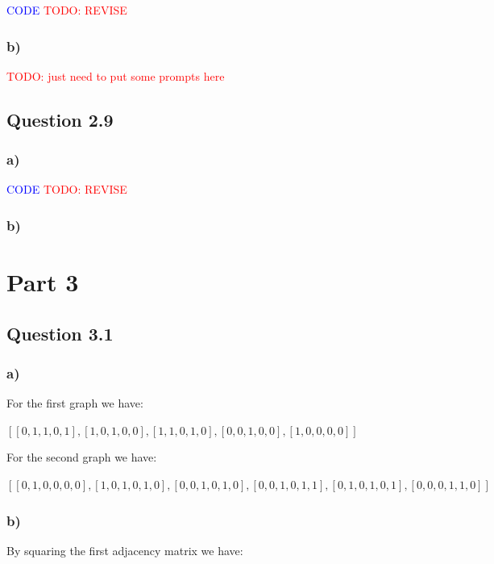 \documentclass{article}
\begin{document}
\textcolor{blue}{CODE}
\textcolor{red}{TODO: REVISE}

\subsubsection*{b)}

\textcolor{red}{TODO: just need to put some prompts here}

\subsection*{Question 2.9}

\subsubsection*{a)}

\textcolor{blue}{CODE}
\textcolor{red}{TODO: REVISE}

\subsubsection*{b)}

\newpage

\section*{Part 3}

\subsection*{Question 3.1}

\subsubsection*{a)}

For the first graph we have:

$[
[0, 1, 1, 0, 1],
[1, 0, 1, 0, 0],
[1, 1, 0, 1, 0],
[0, 0, 1, 0, 0],
[1, 0, 0, 0, 0]]$

For the second graph we have:

$[
[0, 1, 0, 0, 0, 0],
[1, 0, 1, 0, 1, 0],
[0, 0, 1, 0, 1, 0],
[0, 0, 1, 0, 1, 1],
[0, 1, 0, 1, 0, 1], 
[0, 0, 0, 1, 1, 0]]$

\subsubsection*{b)}

By squaring the first adjacency matrix we have:
\end{document}
